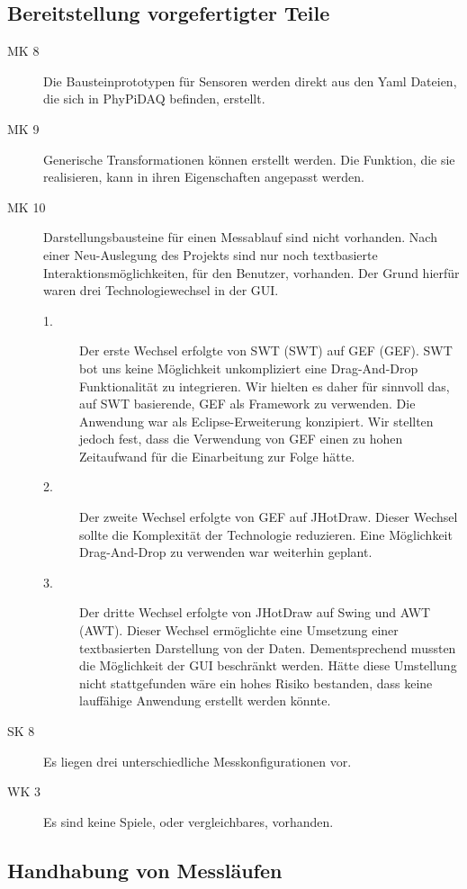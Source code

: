 \documentclass[parskip=full]{scrartcl}
\begin{document}
\subsection {Bereitstellung vorgefertigter Teile}

\begin{description}
\item[MK 8] Die Bausteinprototypen für Sensoren werden direkt aus den Yaml Dateien, die sich in PhyPiDAQ befinden, erstellt.
\item[MK 9] Generische Transformationen können erstellt werden. Die Funktion, die sie realisieren, kann in ihren Eigenschaften angepasst werden.
\item[MK 10] Darstellungsbausteine für einen Messablauf sind nicht vorhanden. Nach einer Neu-Auslegung des Projekts sind nur noch textbasierte Interaktionsmöglichkeiten, für den Benutzer, vorhanden. Der Grund hierfür waren drei Technologiewechsel in der GUI.
\begin{description}
	\item[1.] Der erste Wechsel erfolgte von \gls{SWT} (SWT) auf \gls{GEF} (GEF). SWT bot uns keine Möglichkeit unkompliziert eine Drag-And-Drop Funktionalität zu integrieren. Wir hielten es daher für sinnvoll das, auf SWT basierende, GEF als Framework zu verwenden. Die Anwendung war als Eclipse-Erweiterung konzipiert. Wir stellten jedoch fest, dass die Verwendung von GEF einen zu hohen Zeitaufwand für die Einarbeitung zur Folge hätte.
	\item[2.] Der zweite Wechsel erfolgte von GEF auf \gls{JHotDraw}. Dieser Wechsel sollte die Komplexität der Technologie reduzieren. Eine Möglichkeit Drag-And-Drop zu verwenden war weiterhin geplant.
	\item[3.] Der dritte Wechsel erfolgte von JHotDraw auf \gls{Swing} und \gls{AWT} (AWT). Dieser Wechsel ermöglichte eine Umsetzung einer textbasierten Darstellung von der Daten. Dementsprechend mussten die Möglichkeit der GUI beschränkt werden. Hätte diese Umstellung nicht stattgefunden wäre ein hohes Risiko bestanden, dass keine lauffähige Anwendung erstellt werden könnte.
\end{description}
\item[SK 8] Es liegen drei unterschiedliche Messkonfigurationen vor.
\item[WK 3] Es sind keine Spiele, oder vergleichbares, vorhanden.
\end{description}

\subsection{Handhabung von Messläufen}
\end{document}
